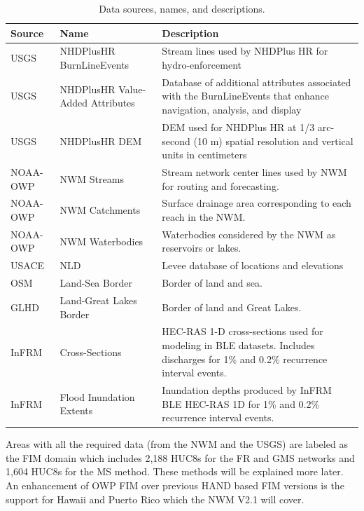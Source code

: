 \begin{table}
\caption{Data sources, names, and descriptions.}
\label{tab:data}
\centering
\begin{tabular}{|p{2cm}|p{4cm}|p{8cm}|}
\hline
Source & Name & Description \\
\hline
USGS & NHDPlusHR BurnLineEvents & Stream lines used by NHDPlus HR for hydro-enforcement \\
\hline
USGS & NHDPlusHR Value-Added Attributes & Database of additional attributes associated with the BurnLineEvents that enhance navigation, analysis, and display \\
\hline
USGS & NHDPlusHR DEM & DEM used for NHDPlus HR at 1/3 arc-second (10 m) spatial resolution and vertical units in centimeters \\
\hline
NOAA-OWP & NWM Streams & Stream network center lines used by NWM for routing and forecasting. \\
\hline
NOAA-OWP & NWM Catchments & Surface drainage area corresponding to each reach in the NWM. \\
\hline
NOAA-OWP & NWM Waterbodies & Waterbodies considered by the NWM as reservoirs or lakes. \\
\hline
USACE & NLD & Levee database of locations and elevations  \\
\hline
OSM & Land-Sea Border & Border of land and sea. \\
\hline
GLHD & Land-Great Lakes Border & Border of land and Great Lakes. \\
\hline
InFRM & Cross-Sections & HEC-RAS 1-D cross-sections used for modeling in BLE datasets. Includes discharges for 1\% and 0.2\% recurrence interval events. \\
\hline
InFRM & Flood Inundation Extents & Inundation depths produced by InFRM BLE HEC-RAS 1D for 1\% and 0.2\% recurrence interval events. \\
\hline
\end{tabular}
\end{table}
%
Areas with all the required data (from the NWM and the USGS) are labeled as the FIM domain which includes 2,188 HUC8s for the FR and GMS networks and 1,604 HUC8s for the MS method. 
These methods will be explained more later.
An enhancement of OWP FIM over previous HAND based FIM versions is the support for Hawaii and Puerto Rico which the NWM V2.1 will cover.
%
